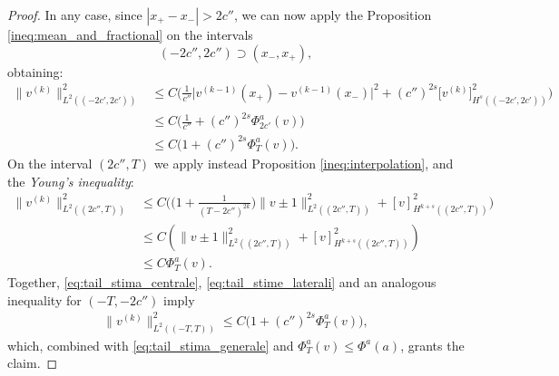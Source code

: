 \documentclass{article}
\theoremstyle{definition}
\newcommand{\abs}[1]{\left|#1\right|}
\begin{document}
\begin{proof}
In any case, since $ \abs{x_+-x_-} > 2c''$, we can now apply the Proposition \ref{ineq:mean_and_fractional} on the intervals 
\[  (-2c'',2c'') \supset  (x_-,x_+),\] 
obtaining:
\begin{equation}\label{eq:tail_stima_centrale}
    \begin{split}
        \|v^{(k)}\|^2_{L^2((-2c',2c'))} &\leq C\Big(\frac{1}{c''}\big|v^{(k-1)}(x_+)-v^{(k-1)}(x_-)\big|^2 + (c'')^{2s}\big[v^{(k)}\big]^2_{H^s((-2c',2c'))}\Big)\\
        &\leq C\Big(\frac{1}{c''}+(c'')^{2s}\Phi^a_{2c'}(v)\Big)\\
        &\leq C\big(1+(c'')^{2s}\Phi^a_T(v)\big).
    \end{split}
\end{equation}
On the interval $(2c'',T )$ we apply instead Proposition \ref{ineq:interpolation}, and the  \emph{Young's inequality}:
\begin{equation}\label{eq:tail_stime_laterali}
 \begin{split}
        \|v^{(k)} \|^2_{L^2((2c'',T ))} &\leq  C\Big(\Big(1+\frac{1}{(T-2c'')^{2k}}\Big)\|v\pm 1\|_{L^2((2c'',T ))}^2+[v]_{H^{k+s}((2c'',T))}^2\Big)\\
        &\leq  C(\|v\pm 1\|_{L^2((2c'',T ))}^2+[v]_{H^{k+s}((2c'',T))}^2)\\
        &\leq C  \Phi^a_T(v).
 \end{split} \end{equation}
    Together, \eqref{eq:tail_stima_centrale}, \eqref{eq:tail_stime_laterali} and an analogous inequality for $(-T,-2c'')$ imply
\begin{equation*}
    \begin{split}
        \|v^{(k)}\|^2_{L^2((-T,T))}\leq C\big(1+(c'')^{2s}\Phi^a_T(v)\big) ,
    \end{split}
\end{equation*}
which, combined with \eqref{eq:tail_stima_generale} and  $\Phi_T^a(v)\leq \Phi^a(a)$, grants the claim.


\end{proof}
\end{document}
